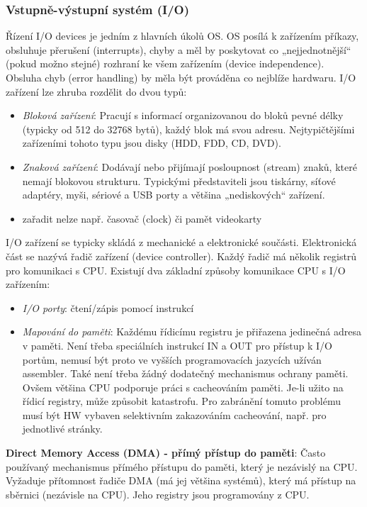\subsubsection*{Vstupně-výstupní systém (I/O)}
Řízení I/O devices je jedním z hlavních úkolů OS. OS posílá k zařízením příkazy, obsluhuje přerušení (interrupts), chyby a měl by poskytovat co „nejjednotnější“ (pokud možno stejné) rozhraní ke všem zařízením (device independence). Obsluha chyb (error handling) by měla být prováděna co nejblíže
hardwaru. I/O zařízení lze zhruba rozdělit do dvou typů:
\begin{itemize}
\item \textit{Bloková zařízení}: Pracují s informací organizovanou do bloků pevné délky (typicky od 512 do 32768 bytů), každý blok má svou adresu. Nejtypičtějšími zařízeními tohoto typu jsou disky (HDD, FDD, CD, DVD).
\item \textit{Znaková zařízení}: Dodávají nebo přijímají posloupnost (stream) znaků, které nemají blokovou strukturu. Typickými představiteli jsou tiskárny, síťové adaptéry, myši, sériové a USB porty a většina „nediskových“ zařízení.
\item zařadit nelze např. časovač (clock) či pamět videokarty
\end{itemize}
I/O zařízení se typicky skládá z mechanické a elektronické součásti. Elektronická část se nazývá řadič zařízení (device controller). Každý řadič má několik registrů pro komunikaci s CPU. Existují dva základní způsoby komunikace CPU s I/O zařízením:
\begin{itemize}
\item \textit{I/O porty}: čtení/zápis pomocí instrukcí
\item \textit{Mapování do paměti}: Každému řídicímu registru je přiřazena jedinečná adresa v paměti. Není třeba speciálních instrukcí IN a OUT pro přístup k I/O portům, nemusí být proto ve vyšších programovacích jazycích užíván assembler. Také není třeba žádný dodatečný mechanismus ochrany paměti. Ovšem většina CPU podporuje práci s cacheováním paměti. Je-li užito na řídicí registry, může způsobit katastrofu. Pro zabránění tomuto problému musí být HW vybaven selektivním zakazováním cacheování, např. pro jednotlivé stránky.
\end{itemize}

\textbf{Direct Memory Access (DMA) - přímý přístup do paměti}: Často používaný mechanismus přímého přístupu do paměti, který je nezávislý na CPU. Vyžaduje přítomnost řadiče DMA (má jej většina systémů), který má přístup na sběrnici (nezávisle na CPU). Jeho registry jsou programovány z CPU.

